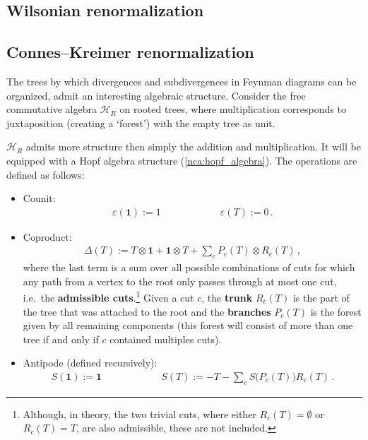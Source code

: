 \subsection{Wilsonian renormalization}


 \subsection{Connes--Kreimer renormalization}

    The trees by which divergences and subdivergences in Feynman diagrams can be organized, admit an interesting algebraic structure. Consider the free commutative algebra $\mathcal{H}_R$ on rooted trees, where multiplication corresponds to juxtaposition (creating a `forest') with the empty tree as unit.

    $\mathcal{H}_R$ admits more structure then simply the addition and multiplication. It will be equipped with a Hopf algebra structure (\cref{nca:hopf_algebra}). The operations are defined as follows:
    \begin{itemize}
        \item Counit:
        \begin{gather}
            \label{qft:connes_kreimer_counit}
            \varepsilon(\mathbf{1}):=1 \qquad\qquad\qquad \varepsilon(T):=0\,.
        \end{gather}
        \item Coproduct:
        \begin{gather}
            \Delta(T) := T\otimes\mathbf{1}+\mathbf{1}\otimes T+\sum_cP_c(T)\otimes R_c(T)\,,
        \end{gather}
        where the last term is a sum over all possible combinations of cuts for which any path from a vertex to the root only passes through at most one cut, i.e.~the \textbf{admissible cuts}.\footnote{Although, in theory, the two trivial cuts, where either $R_c(T)=\emptyset$ or $R_c(T)=T$, are also admissible, these are not included.} Given a cut $c$, the \textbf{trunk} $R_c(T)$ is the part of the tree that was attached to the root and the \textbf{branches} $P_c(T)$ is the forest given by all remaining components (this forest will consist of more than one tree if and only if $c$ contained multiples cuts).
        \item Antipode (defined recursively):
        \begin{gather}
            \label{qft:antipode}
            S(\mathbf{1}) := \mathbf{1} \qquad\qquad\qquad S(T) := -T-\sum_cS\bigl(P_c(T)\bigr)R_c(T)\,.
        \end{gather}
    \end{itemize}

